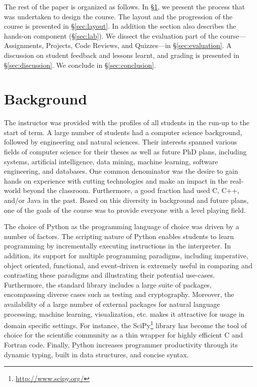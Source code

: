\documentclass[letterpaper,twocolumn,10pt]{article}
\begin{document}
The rest of the paper is organized as follows. In \S\ref{sec:background}, we
present the process that was undertaken to design the course. The layout and the
progression of the course is presented in \S\ref{sec:layout}. In addition the
section also describes the hands-on component (\S\ref{sec:lab}). We dissect the
evaluation part of the course---Assignments, Projects, Code Reviews, and
Quizzes---in \S\ref{sec:evaluation}. A discussion on student feedback and
lessons learnt, and grading is presented in \S\ref{sec:discussion}.
We conclude in \S\ref{sec:conclusion}.

\section{Background}\label{sec:background}
The instructor was provided with the profiles of all students in the run-up to
the start of term. A large number of students had a computer science background,
followed by engineering and natural sciences. Their interests spanned various
fields of computer science for their theses as well as future PhD plans,
including systems, artificial intelligence, data mining, machine learning,
software engineering, and databases. One common denominator was the desire to
gain hands on experience with cutting technologies and make an impact in the
real-world beyond the classroom. Furthermore, a good fraction had used C, C++,
and/or Java in the past. Based on this diversity in background and future plans,
one of the goals of the course was to provide everyone with a level playing
field.

The choice of Python as the programming language of choice was driven by a
number of factors. The scripting nature of Python enables students to learn
programming by incrementally executing instructions in the interpreter. In
addition, its support for multiple programming paradigms, including imperative,
object oriented, functional, and event-driven is extremely useful in comparing
and contrasting these paradigms and illustrating their potential use-cases.
Furthermore, the standard library includes a large suite of packages,
encompassing diverse cases such as testing and cryptography. Moreover, the
availability of a large number of external packages for natural language
processing, machine learning, visualization, etc. makes it attractive for usage
in domain specific settings. For instance, the
SciPy\footnote{\url{http://www.scipy.org/}} library has become the tool of
choice for the scientific community as a thin wrapper for highly efficient C and
Fortran code. Finally, Python increases programmer productivity through its
dynamic typing, built in data structures, and concise syntax.
\end{document}
